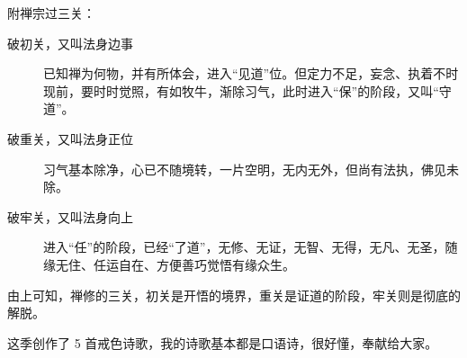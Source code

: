 附禅宗过三关：

\begin{description}
    \item[破初关，又叫法身边事] 已知禅为何物，并有所体会，进入“见道”位。但定力不足，妄念、执着不时现前，要时时觉照，有如牧牛，渐除习气，此时进入“保”的阶段，又叫“守道”。
    \item[破重关，又叫法身正位] 习气基本除净，心已不随境转，一片空明，无内无外，但尚有法执，佛见未除。
    \item[破牢关，又叫法身向上] 进入“任”的阶段，已经“了道”，无修、无证，无智、无得，无凡、无圣，随缘无住、任运自在、方便善巧觉悟有缘众生。
\end{description}

由上可知，禅修的三关，初关是开悟的境界，重关是证道的阶段，牢关则是彻底的解脱。

这季创作了 5 首戒色诗歌，我的诗歌基本都是口语诗，很好懂，奉献给大家。

